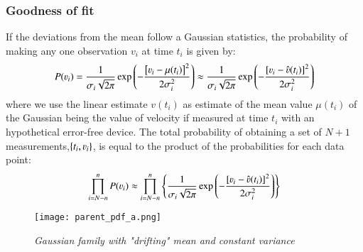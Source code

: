 \subsubsection{Goodness of fit}
If the deviations from the mean follow a Gaussian statistics, the probability of making any one observation $v_i$ at time $t_i$ is given by:
\begin{equation}
P(\varv_i)=\frac{1}{\sigma_i\sqrt{2\pi}}\exp\left (-\frac{\left [\varv_i-\mu(t_i)\right]^2}{2\sigma_i^2}\right)
\approx\frac{1}{\sigma_i\sqrt{2\pi}}\exp\left (-\frac{\left [\varv_i-\hat{\varv}(t_i)\right]^2}{2\sigma_i^2}\right)
\end{equation}
where we use the linear estimate $v(t_i)$ as estimate of the mean value $\mu(t_i)$ of the Gaussian being the value of velocity if measured at time $t_i$ with an hypothetical error-free device.
The total probability of obtaining a set of $N+1$ measurements,$ \{t_i ,\varv_i \}$, is
equal to the product of the probabilities for each data point:
\begin{equation}
\prod_{i=N-n}^nP(\varv_i)\approx\prod_{i=N-n}^n\left \{ \frac{1}{\sigma_i\sqrt{2\pi}}\exp\left (-\frac{\left [\varv_i-\hat{\varv}(t_i)\right]^2}{2\sigma_i^2}\right)\right\}
\end{equation}
\begin{figure}[h!]
\centerline{
\texttt{[image: parent\_pdf\_a.png]}
}
\caption{\emph{Gaussian family with "drifting" mean and constant variance}}
\label {fig:parent_pdf}
\end{figure}




\noindent



